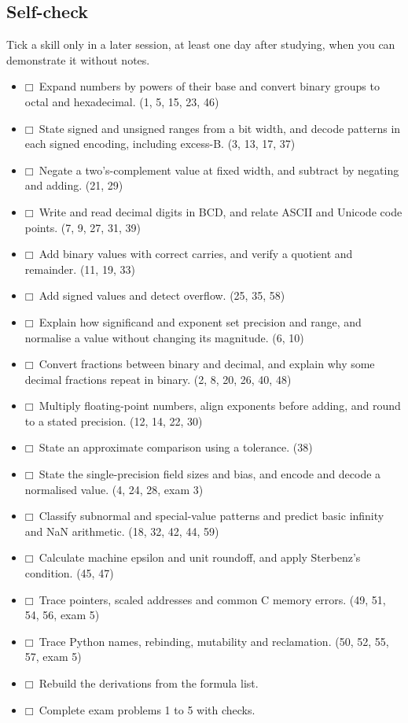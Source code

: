 \documentclass[11pt]{article}
\begin{document}
\begin{keepsection}
\section{Self-check}

Tick a skill only in a later session, at least one day after studying, when you can demonstrate it without notes.

\begin{itemize}
\item $\mdlgwhtsquare$\  Expand numbers by powers of their base and convert binary groups to octal and hexadecimal. (1, 5, 15, 23, 46)
\item $\mdlgwhtsquare$\  State signed and unsigned ranges from a bit width, and decode patterns in each signed encoding, including excess-B. (3, 13, 17, 37)
\item $\mdlgwhtsquare$\  Negate a two’s-complement value at fixed width, and subtract by negating and adding. (21, 29)
\item $\mdlgwhtsquare$\  Write and read decimal digits in BCD, and relate ASCII and Unicode code points. (7, 9, 27, 31, 39)
\item $\mdlgwhtsquare$\  Add binary values with correct carries, and verify a quotient and remainder. (11, 19, 33)
\item $\mdlgwhtsquare$\  Add signed values and detect overflow. (25, 35, 58)
\item $\mdlgwhtsquare$\  Explain how significand and exponent set precision and range, and normalise a value without changing its magnitude. (6, 10)
\item $\mdlgwhtsquare$\  Convert fractions between binary and decimal, and explain why some decimal fractions repeat in binary. (2, 8, 20, 26, 40, 48)
\item $\mdlgwhtsquare$\  Multiply floating-point numbers, align exponents before adding, and round to a stated precision. (12, 14, 22, 30)
\item $\mdlgwhtsquare$\  State an approximate comparison using a tolerance. (38)
\item $\mdlgwhtsquare$\  State the single-precision field sizes and bias, and encode and decode a normalised value. (4, 24, 28, exam 3)
\item $\mdlgwhtsquare$\  Classify subnormal and special-value patterns and predict basic infinity and NaN arithmetic. (18, 32, 42, 44, 59)
\item $\mdlgwhtsquare$\  Calculate machine epsilon and unit roundoff, and apply Sterbenz’s condition. (45, 47)
\item $\mdlgwhtsquare$\  Trace pointers, scaled addresses and common C memory errors. (49, 51, 54, 56, exam 5)
\item $\mdlgwhtsquare$\  Trace Python names, rebinding, mutability and reclamation. (50, 52, 55, 57, exam 5)
\item $\mdlgwhtsquare$\  Rebuild the derivations from the formula list.
\item $\mdlgwhtsquare$\  Complete exam problems 1 to 5 with checks.
\end{itemize}
\end{keepsection}
\end{document}
